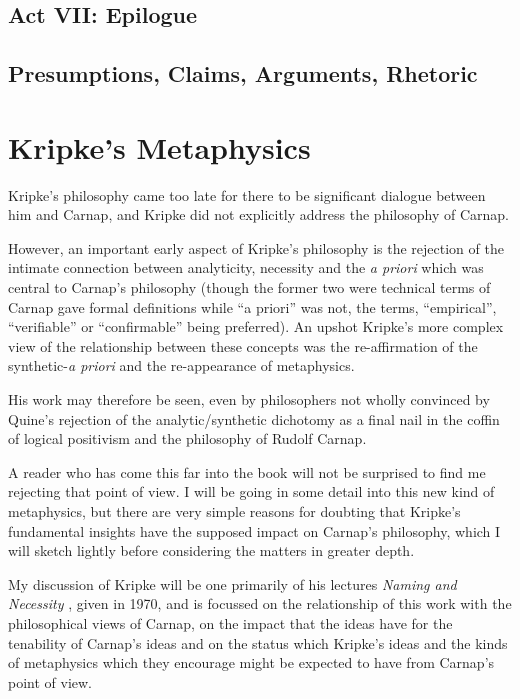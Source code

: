 \section{Act VII: Epilogue}

\section{Presumptions, Claims, Arguments, Rhetoric}

\chapter{Kripke's Metaphysics}

Kripke's philosophy came too late for there to be significant dialogue
between him and Carnap, and Kripke did not explicitly address the
philosophy of Carnap.

However, an important early aspect of Kripke's philosophy is the rejection
of the intimate connection between analyticity, necessity and the \emph{a priori}
which was central to Carnap's philosophy (though the former two were
technical terms of Carnap gave formal definitions while ``a priori'' was
not, the terms, ``empirical'', ``verifiable'' or ``confirmable'' being preferred).
An upshot Kripke's more complex view of the relationship between these concepts
was the re-affirmation of the synthetic-\emph{a priori} and the re-appearance of
metaphysics.

His work may therefore be seen, even by philosophers not wholly convinced
by Quine's rejection of the analytic/synthetic dichotomy as a final nail
in the coffin of logical positivism and the philosophy of Rudolf Carnap.

A reader who has come this far into the book will not be surprised to find
me rejecting that point of view.
I will be going in some detail into this new kind of metaphysics, but there
are very simple reasons for doubting that Kripke's fundamental insights have
the supposed impact on Carnap's philosophy, which I will sketch lightly
before considering the matters in greater depth.

My discussion of Kripke will be one primarily of his lectures
\emph{Naming and Necessity} \cite{Kripke72}, given in 1970, and is focussed
on the relationship of this work with the philosophical views of Carnap, on
the impact that the ideas have for the tenability of Carnap's ideas
and on the status which Kripke's ideas and the kinds of metaphysics which
they encourage might be expected to have from Carnap's point of view.

